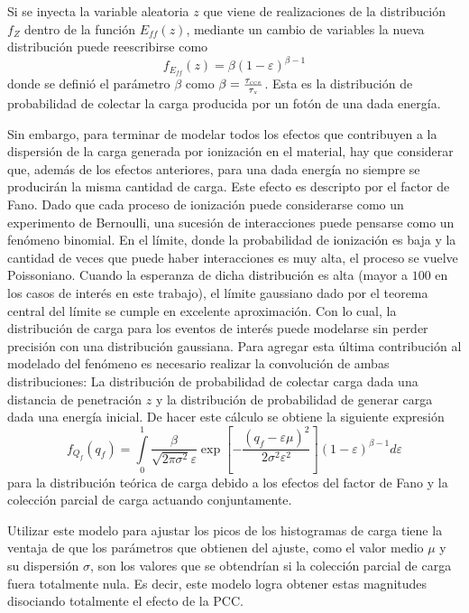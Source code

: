 Si se inyecta la variable aleatoria $z$ que viene de realizaciones de la distribución $f_{Z}$ dentro de la función $E_{ff}(z)$, mediante un cambio de variables la nueva distribución puede reescribirse como
\begin{equation*}
    f_{E_{ff}}(z) = \beta (1 - \varepsilon)^{\beta - 1}
\end{equation*}
donde se definió el parámetro $\beta$ como $\beta = \frac{\tau_{\scaleto{CCE}{2pt}}}{\tau_{\scaleto{X}{2pt}}}$. Esta es la distribución de probabilidad de colectar la carga producida por un fotón de una dada energía.

Sin embargo, para terminar de modelar todos los efectos que contribuyen a la dispersión de la carga generada por ionización en el material, hay que considerar que, además de los efectos anteriores, para una dada energía no siempre se producirán la misma cantidad de carga. Este efecto es descripto por el factor de Fano. Dado que cada proceso de ionización puede considerarse como un experimento de Bernoulli, una sucesión de interacciones puede pensarse como un fenómeno binomial. En el límite, donde la probabilidad de ionización es baja y la cantidad de veces que puede haber interacciones es muy alta, el proceso se vuelve Poissoniano. Cuando la esperanza de dicha distribución es alta (mayor a $100$ en los casos de interés en este trabajo), el límite gaussiano dado por el teorema central del límite se cumple en excelente aproximación. Con lo cual, la distribución de carga para los eventos de interés puede modelarse sin perder precisión con una distribución gaussiana. Para agregar esta última contribución al modelado del fenómeno es necesario realizar la convolución de ambas distribuciones: La distribución de probabilidad de colectar carga dada una distancia de penetración $z$ y la distribución de probabilidad de generar carga dada una energía inicial. De hacer este cálculo se obtiene la siguiente expresión
\begin{equation*}
    f_{Q_{f}}(q_{f}) = 
    \int\limits_{0}^{1}
    \frac{\beta}{\sqrt{2\pi \sigma^{2}}\varepsilon}
    \exp[%
    -\frac{(q_{f}-\varepsilon\mu)^{2}}{2\sigma^{2}\varepsilon^{2}}
    ](1-\varepsilon)^{\beta - 1}
    d\varepsilon
\end{equation*}
para la distribución teórica de carga debido a los efectos del factor de Fano y la colección parcial de carga actuando conjuntamente.

Utilizar este modelo para ajustar los picos de los histogramas de carga tiene la ventaja de que los parámetros que obtienen del ajuste, como el valor medio $\mu$ y su dispersión $\sigma$, son los valores que se obtendrían si la colección parcial de carga fuera totalmente nula. Es decir, este modelo logra obtener estas magnitudes disociando totalmente el efecto de la PCC. 



